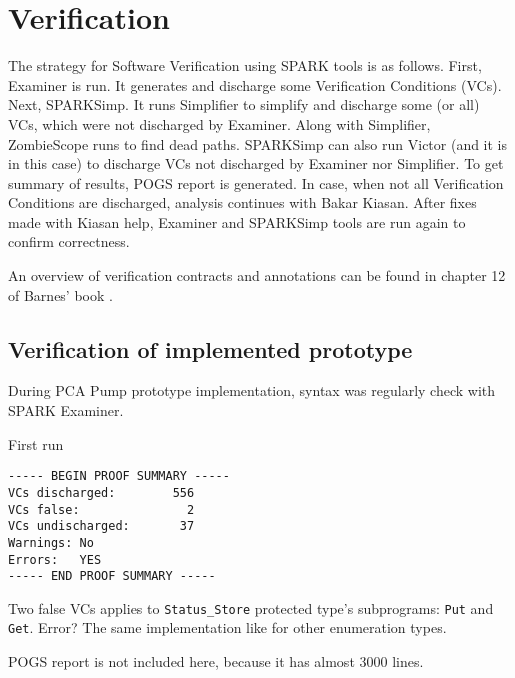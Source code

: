 
\cleardoublepage

\chapter{Verification}
\label{verification}


The strategy for Software Verification using SPARK tools is as follows. First, Examiner is run. It generates and discharge some Verification Conditions (VCs). Next, SPARKSimp. It runs Simplifier to simplify and discharge some (or all) VCs, which were not discharged by Examiner. Along with Simplifier, ZombieScope runs to find dead paths. SPARKSimp can also run Victor (and it is in this case) to discharge VCs not discharged by Examiner nor Simplifier. To get summary of results, POGS report is generated. In case, when not all Verification Conditions are discharged, analysis continues with Bakar Kiasan. After fixes made with Kiasan help, Examiner and SPARKSimp tools are run again to confirm correctness.


An overview of verification contracts and annotations can be found in chapter 12 of Barnes' book \cite{Barnes:Book}.

\section{Verification of implemented prototype}
\label{verification:prototype}

During PCA Pump prototype implementation, syntax was regularly check with SPARK Examiner.

First run
\begin{lstlisting}[frame=single, gobble=0, caption={POGS report for PCA Pump prototype}, label={listing:pcapump_prototype_pogs}]
----- BEGIN PROOF SUMMARY -----
VCs discharged:        556
VCs false:               2
VCs undischarged:       37
Warnings: No
Errors:   YES
----- END PROOF SUMMARY ----- 
\end{lstlisting}

Two false VCs applies to \lstinline{Status_Store} protected type's subprograms: \lstinline{Put} and \lstinline{Get}.
Error? The same implementation like for other enumeration types.

POGS report is not included here, because it has almost 3000 lines.

